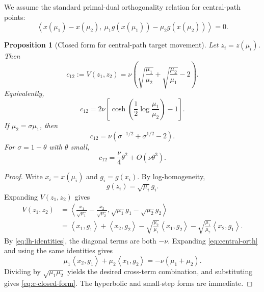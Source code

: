 \documentclass[11pt]{article}
\newtheorem{proposition}[theorem]{Proposition}
\newcommand{\ip}[2]{\left\langle #1,#2\right\rangle}
\begin{document}
We assume the standard primal-dual orthogonality relation for central-path points:
\begin{equation}
  \left\langle x(\mu_1)-x(\mu_2),\ \mu_1 g(x(\mu_1))-\mu_2 g(x(\mu_2))\right\rangle=0.       \label{eq:central-orth}
\end{equation}

\begin{proposition}[Closed form for central-path target movement]
Let $z_i=z(\mu_i)$. Then
\begin{equation}
  c_{12}:=V(z_1,z_2)
  =\nu\left(
  \sqrt{\frac{\mu_1}{\mu_2}}
  +
  \sqrt{\frac{\mu_2}{\mu_1}}
  -2
  \right).                                      \label{eq:c-closed-form}
\end{equation}
Equivalently,
\begin{equation}
  c_{12}=2\nu\left[
  \cosh\left(\frac12\log\frac{\mu_1}{\mu_2}\right)-1
  \right].                                      \label{eq:c-hyperbolic}
\end{equation}
If $\mu_2=\sigma\mu_1$, then
\begin{equation}
  c_{12}=\nu\left(\sigma^{-1/2}+\sigma^{1/2}-2\right).       \label{eq:c-sigma}
\end{equation}
For $\sigma=1-\theta$ with $\theta$ small,
\begin{equation}
  c_{12}=\frac{\nu}{4}\theta^2+O(\nu\theta^3).       \label{eq:c-small-theta}
\end{equation}
\end{proposition}

\begin{proof}
Write $x_i=x(\mu_i)$ and $g_i=g(x_i)$.  By log-homogeneity,
\[
  g(z_i)=\sqrt{\mu_i}g_i.
\]
Expanding $V(z_1,z_2)$ gives
\begin{align*}
  V(z_1,z_2)
  &=\left\langle
  \frac{x_1}{\sqrt{\mu_1}}-\frac{x_2}{\sqrt{\mu_2}},
  \sqrt{\mu_1}g_1-\sqrt{\mu_2}g_2
  \right\rangle \\
  &=\ip{x_1}{g_1}+\ip{x_2}{g_2}
  -\sqrt{\frac{\mu_2}{\mu_1}}\ip{x_1}{g_2}
  -\sqrt{\frac{\mu_1}{\mu_2}}\ip{x_2}{g_1}.
\end{align*}
By \eqref{eq:lh-identities}, the diagonal terms are both $-\nu$.  Expanding \eqref{eq:central-orth} and using the same identities gives
\[
  \mu_1\ip{x_2}{g_1}+\mu_2\ip{x_1}{g_2}=-\nu(\mu_1+\mu_2).
\]
Dividing by $\sqrt{\mu_1\mu_2}$ yields the desired cross-term combination, and substituting gives \eqref{eq:c-closed-form}.  The hyperbolic and small-step forms are immediate.
\end{proof}
\end{document}

